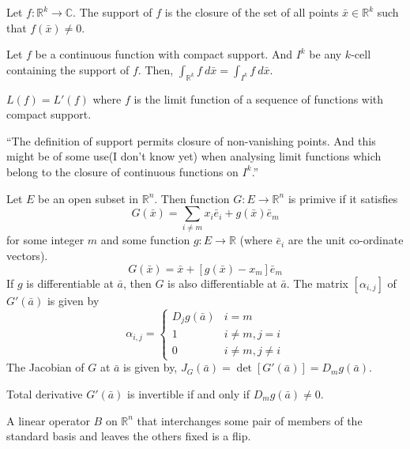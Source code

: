 \begin{definition}
	Let $f : \mathbb{R}^k \to \mathbb{C}$.
	The support of $f$ is the closure of the set of all points $\bar{x} \in \mathbb{R}^k$ such that $f(\bar{x}) \ne 0$.

	Let $f$ be a continuous function with compact support.
	And $I^k$ be any $k$-cell containing the support of $f$.
	Then, $\int_{\mathbb{R}^k} f\ d\bar{x} = \int_{I^k} f\ d\bar{x}$.
\end{definition}

\begin{commentary}
	$L(f) = L'(f)$ where $f$ is the limit function of a sequence of functions with compact support.
	\cite[\S10.4 Example]{apostol}

	``The definition of support permits closure of non-vanishing points.
	And this might be of some use(I don't know yet) when analysing limit functions which belong to the closure of continuous functions on $I^k$.''
\end{commentary}

\begin{definition}
	Let $E$ be an open subset in $\mathbb{R}^n$.
	Then function $G : E \to \mathbb{R}^n$ is primive if it satisfies
	\begin{equation}
		G(\bar{x}) = \sum_{i \ne m} x_i \bar{e}_i + g(\bar{x})\bar{e}_m
	\end{equation}
	for some integer $m$ and some function $g : E \to \mathbb{R}$ (where $\bar{e}_i$ are the unit co-ordinate vectors).
	\begin{equation}
		G(\bar{x}) = \bar{x} + [g(\bar{x})-x_m]\bar{e}_m
	\end{equation}
	If $g$ is differentiable at $\bar{a}$, then $G$ is also differentiable at $\bar{a}$.
	The matrix $[\alpha_{i,j}]$ of $G'(\bar{a})$ is given by 
	$$\alpha_{i,j} = \begin{cases} 
		D_jg(\bar{a}) & i = m\\
		1 & i \ne m, j = i \\
		0 & i \ne m, j \ne i
	\end{cases} $$
	The Jacobian of $G$ at $\bar{a}$ is given by,
	$J_G(\bar{a}) = \det[G'(\bar{a})] = D_mg(\bar{a})$.

	Total derivative $G'(\bar{a})$ is invertible if and only if $D_mg(\bar{a}) \ne 0$.
\end{definition}

\begin{definition}
	A linear operator $B$ on $\mathbb{R}^n$ that interchanges some pair of members of the standard basis and leaves the others fixed is a flip.
\end{definition}

